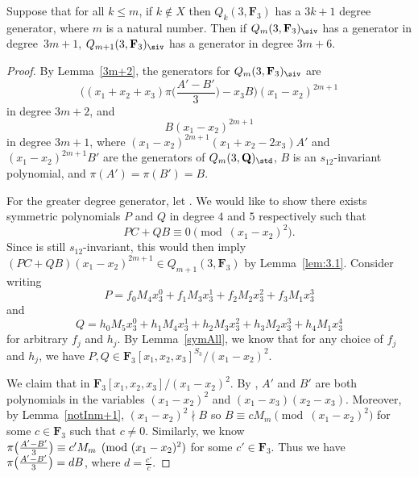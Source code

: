 \begin{Lemma}\label{3m+6}
 Suppose that for all $k\leq m$, if $k\not\in X$ then $Q_k(3,\mathbf{F}_3)$ has a $3k+1$ degree generator, where $m$ is a natural number. Then if $Q_m(3,\mathbf{F}_3)_{\siv}$ has a generator in degree~${3m+1}$, $Q_{m+1}(3,\mathbf{F}_3)_{\siv}$ has a generator in degree $3m+6$.
\end{Lemma}
\begin{proof}
 By Lemma~\ref{3m+2}, the generators for $Q_m(3,\mathbf{F}_3)_{\siv}$ are
 \[\biggl((x_1+x_2+x_3)\pi\biggl(\frac{A'-B'}{3}\biggr)-x_3B\biggr)(x_1-x_2)^{2m+1}\]
 in degree $3m+2$, and
 \[B(x_1-x_2)^{2m+1}\]
 in degree $3m+1$, where $(x_1-x_2)^{2m+1}(x_1+x_2-2x_3)A'$ and $(x_1-x_2)^{2m+1}B'$ are the generators of $Q_m(3,\mathbf{Q})_{\std}$, $B$ is an $s_{12}$-invariant polynomial, and $\pi(A')=\pi(B')=B$.

 For the greater degree generator, let . We would like to show there exists symmetric polynomials $P$ and $Q$ in degree $4$ and $5$ respectively such that
 \[PC+QB \equiv 0\pmod{(x_1-x_2)^2}.\]
 Since  is still $s_{12}$-invariant, this would then imply $(PC+QB)(x_1-x_2)^{2m+1}\in Q_{m+1}(3,\mathbf{F}_3)$ by Lemma~\ref{lem:3.1}. Consider writing
 \[P=f_0M_4x_3^0+f_1M_{3}x_3^1 + f_{2}M_2x_3^{2}+f_{3}M_1x_3^{3}\]
 and
 \[Q=h_0M_5x_3^0+h_1M_4x_3^1+h_2M_3x_3^2+h_3M_2x_3^3+h_4M_1x_3^4\]
 for arbitrary $f_j$ and $h_j$. By Lemma~\ref{symAll}, we know that for any choice of $f_j$ and $h_j$, we have $P,Q\in \mathbf{F}_3[x_1,x_2,x_3]^{S_3}/(x_1-x_2)^2$.

 We claim that  in $\mathbf{F}_3[x_1,x_2,x_3]/(x_1-x_2)^2$. By \cite{wang2022explicit}, $A'$ and $B'$ are both polynomials in the variables $(x_1-x_2)^2$ and $(x_1-x_3)(x_2-x_3)$. Moreover, by Lemma~\ref{notInm+1}, $(x_1-x_2)^2\nmid B$ so $B\equiv cM_{m}\pmod{(x_1-x_2)^2}$ for some $c\in \mathbf{F}_3$ such that $c\neq 0 $. Similarly, we know $\smash{\pi\big(\frac{A'-B'}{3}\big)} \equiv c'M_{m}\pmod{(x_1-x_2)^2}$ for some $c'\in \mathbf{F}_3$. Thus we have $\smash{\pi\big(\frac{A'-B'}{3}\big)} = dB$, where $d=\frac{c'}{c}$.


\end{proof}
